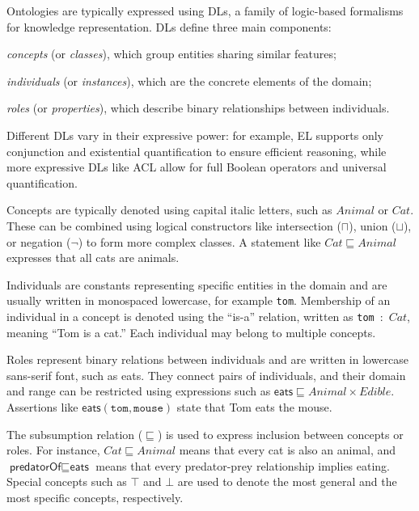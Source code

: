 Ontologies are typically expressed using \glspl{DL}, a family of logic-based formalisms for knowledge representation.
%
\Glspl{DL} define three main components:
%
\begin{inlinelist}
    \item\emph{concepts} (or \emph{classes}), which group entities sharing similar features;
    \item\emph{individuals} (or \emph{instances}), which are the concrete elements of the domain;
    \item\emph{roles} (or \emph{properties}), which describe binary relationships between individuals.
\end{inlinelist}
%
Different \glspl{DL} vary in their expressive power: for example, \gls{EL} supports only conjunction and existential quantification to ensure efficient reasoning, while more expressive DLs like \gls{ACL} allow for full Boolean operators and universal quantification.

Concepts are typically denoted using capital italic letters, such as $\mathit{Animal}$ or $\mathit{Cat}$.
%
These can be combined using logical constructors like intersection ($\sqcap$), union ($\sqcup$), or negation ($\lnot$) to form more complex classes.
%
A statement like $\mathit{Cat} \sqsubseteq \mathit{Animal}$ expresses that all cats are animals.

Individuals are constants representing specific entities in the domain and are usually written in monospaced lowercase, for example \texttt{tom}.
%
Membership of an individual in a concept is denoted using the ``is-a'' relation, written as \texttt{tom}~:~$\mathit{Cat}$, meaning ``Tom is a cat.''
%
Each individual may belong to multiple concepts.

Roles represent binary relations between individuals and are written in lowercase sans-serif font, such as \textsf{eats}.
%
They connect pairs of individuals, and their domain and range can be restricted using expressions such as $\textsf{eats} \sqsubseteq \mathit{Animal} \times \mathit{Edible}$.
%
Assertions like $\textsf{eats}(\texttt{tom}, \texttt{mouse})$ state that Tom eats the mouse.

The subsumption relation ($\sqsubseteq$) is used to express inclusion between concepts or roles.
%
For instance, $\mathit{Cat} \sqsubseteq \mathit{Animal}$ means that every cat is also an animal, and $\textsf{predatorOf} \sqsubseteq \textsf{eats}$ means that every predator-prey relationship implies eating.
%
Special concepts such as $\top$ and $\bot$ are used to denote the most general and the most specific concepts, respectively.

